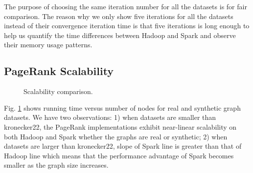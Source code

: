 \documentclass[10pt,conference,compsocconf]{IEEEtran}
\begin{document}
The purpose of choosing the same iteration number for all the datasets is for fair comparison. The reason why we only show five iterations for all the datasets instead of their convergence iteration time is that five iterations is long enough to help us quantify the time differences between Hadoop and Spark and observe their memory usage patterns.



\subsection{PageRank Scalability}

\begin{figure}[!t]
    \centering
    \caption{Scalability comparison.}
    \label{fig:time_vs_size}
\end{figure}

Fig. \ref{fig:time_vs_size} shows running time versus number of nodes for real and synthetic graph datasets. We have two observations: 1) when datasets are smaller than kronecker22, the PageRank implementations exhibit near-linear scalability on both Hadoop and Spark whether the graphs are real or synthetic; 2) when datasets are larger than kronecker22, slope of Spark line is greater than that of Hadoop line which means that the performance advantage of Spark becomes smaller as the graph size increases.
\end{document}
